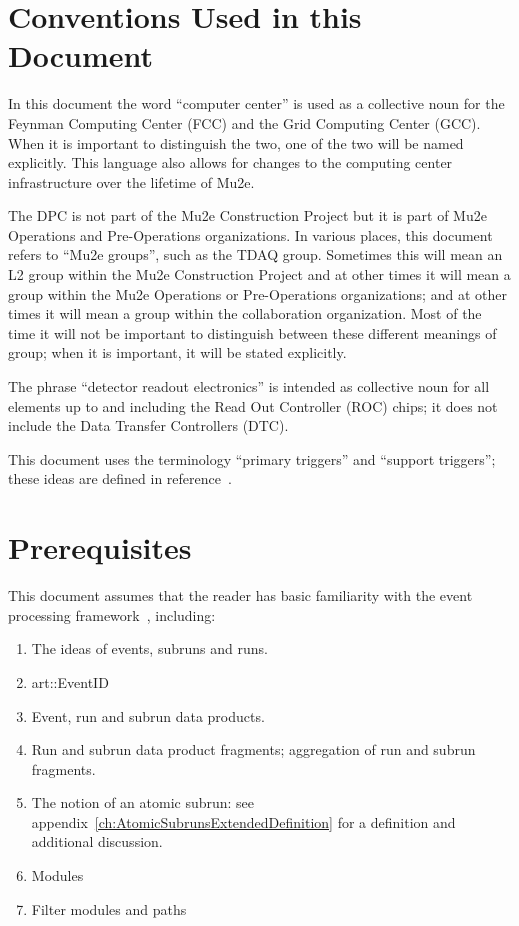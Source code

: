 \section{Conventions Used in this Document}
\label{sec:conventions}

In this document the word ``computer center'' is used as a collective noun for the
Feynman Computing Center (FCC) and the Grid Computing Center (GCC).
When it is important to distinguish the two, one of the two will be named explicitly.
This language also allows for changes to the computing center infrastructure over the
lifetime of Mu2e.

The DPC is not part of the Mu2e Construction Project but it is part of Mu2e Operations
and Pre-Operations organizations.
In various places, this document refers to ``Mu2e groups'', such as the TDAQ group.
Sometimes this will mean an L2 group within the Mu2e Construction Project and at other
times it will mean a group within the Mu2e Operations or Pre-Operations organizations;
and at other times it will mean a group within the collaboration organization.
Most of the time it will not be important to distinguish between these different meanings
of group; when it is important, it will be stated explicitly.

The phrase ``detector readout electronics'' is intended as collective noun for all elements
up to and including the Read Out Controller (ROC) chips; it does not include
the Data Transfer Controllers (DTC).

This document uses the terminology ``primary triggers'' and ``support triggers'';
these ideas are defined in reference~\cite{TriggerSU2020}.



\section{Prerequisites}
\label{sec:prerequisites}

This document assumes that the reader has basic familiarity with the \art event processing framework~\cite{ARTWORDPRESS}, including:

\begin{enumerate}
\item The ideas of events, subruns and runs.
\item {\code art::EventID}
\item Event, run and subrun  data products.
\item Run and subrun data product fragments; aggregation of run and subrun fragments.
\item The notion of an atomic subrun: see appendix~\ref{ch:AtomicSubrunsExtendedDefinition} for a definition and additional discussion.
\item Modules
\item Filter modules and paths
\end{enumerate}

